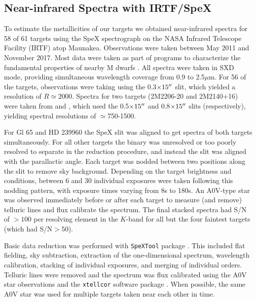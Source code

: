 \documentclass[twocolumn]{aastex62}
\begin{document}
\subsection{Near-infrared Spectra with IRTF/SpeX}

To estimate the metallicities of our targets we obtained near-infrared spectra for 58 of 61 targets using the SpeX spectrograph \citep{Rayner:2003} on the NASA Infrared Telescope Facility (IRTF) atop Maunakea. Observations were taken between May 2011 and November 2017. Most data were taken as part of programs to characterize the fundamental properties of nearby M dwarfs \citep[e.g.,][]{Mann2013c,Gaidos2014,Terrien2015}. All spectra were taken in SXD mode, providing simultaneous wavelength coverage from 0.9 to 2.5$\mu$m. For 56 of the targets, observations were taking using the 0.3$\times15\mbox{$^{\prime\prime}$}$ slit, which yielded a resolution of $R\simeq2000$. Spectra for two targets (2M2206-20 and 2M2140+16) were taken from \citet{2009ApJ...706..328D} and \citet{Dupuy2012}, which used the 0.5$\times15\mbox{$^{\prime\prime}$}$ and 0.8$\times15\mbox{$^{\prime\prime}$}$ slits (respectively), yielding spectral resolutions of $\simeq$750-1500. 

For Gl 65 and HD 239960 the SpeX slit was aligned to get spectra of both targets simultaneously. For all other targets the binary was unresolved or too poorly resolved to separate in the reduction procedure, and instead the slit was aligned with the parallactic angle. Each target was nodded between two positions along the slit to remove sky background. Depending on the target brightness and conditions, between 6 and 30 individual exposures were taken following this nodding pattern, with exposure times varying from 8s to 180s. An A0V-type star was observed immediately before or after each target to measure (and remove) telluric lines and flux calibrate the spectrum. The final stacked spectra had S/N of $>100$ per resolving element in the $K$-band for all but the four faintest targets (which had S/N$>50$). 

Basic data reduction was performed with {\tt SpeXTool} package \citep{Cushing2004}. This included flat fielding, sky subtraction, extraction of the one-dimensional spectrum, wavelength calibration, stacking of individual exposures, and merging of individual orders. Telluric lines were removed and the spectrum was flux calibrated using the A0V star observations and the {\tt xtellcor} software package \citep{Vacca2003}. When possible, the same A0V star was used for multiple targets taken near each other in time. 
\end{document}
